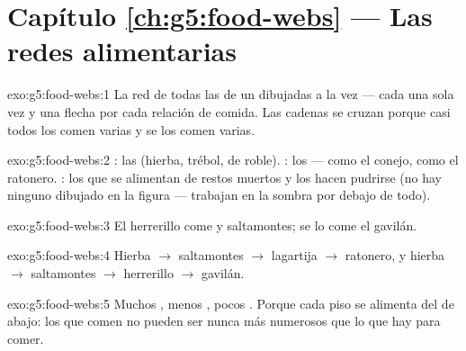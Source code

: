 \section*{Capítulo \ref{ch:g5:food-webs} --- Las redes alimentarias}

\begin{solution}{exo:g5:food-webs:1}
La red de todas las  de un  dibujadas a la
vez --- cada  una sola vez y una flecha por cada relación de
comida. Las cadenas se cruzan porque casi todos los  comen
varias  y se los comen varias.
\end{solution}

\begin{solution}{exo:g5:food-webs:2}
: las  (hierba, trébol,  de roble).
: los  ---  como el conejo, 
como el ratonero. : los que se alimentan de restos
muertos y los hacen pudrirse (no hay ninguno dibujado en la figura ---
trabajan en la sombra por debajo de todo).
\end{solution}

\begin{solution}{exo:g5:food-webs:3}
El herrerillo come  y saltamontes; se lo come el gavilán.
\end{solution}

\begin{solution}{exo:g5:food-webs:4}
Hierba $\rightarrow$ saltamontes $\rightarrow$ lagartija
$\rightarrow$ ratonero, y hierba $\rightarrow$ saltamontes
$\rightarrow$ herrerillo $\rightarrow$ gavilán.
\end{solution}

\begin{solution}{exo:g5:food-webs:5}
Muchos , menos , pocos . Porque cada
piso se alimenta del de abajo: los que comen no pueden ser nunca más
numerosos que lo que hay para comer.
\end{solution}

